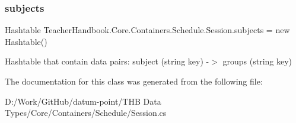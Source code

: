 \subsubsection{\texorpdfstring{subjects}{subjects}}
{\footnotesize\ttfamily Hashtable Teacher\+Handbook.\+Core.\+Containers.\+Schedule.\+Session.\+subjects = new Hashtable()}



Hashtable that contain data pairs\+: subject (string key) -\/$>$ groups (string key) 



The documentation for this class was generated from the following file\+:\begin{DoxyCompactItemize}
\item 
D\+:/\+Work/\+Git\+Hub/datum-\/point/\+T\+H\+B Data Types/\+Core/\+Containers/\+Schedule/Session.\+cs\end{DoxyCompactItemize}
